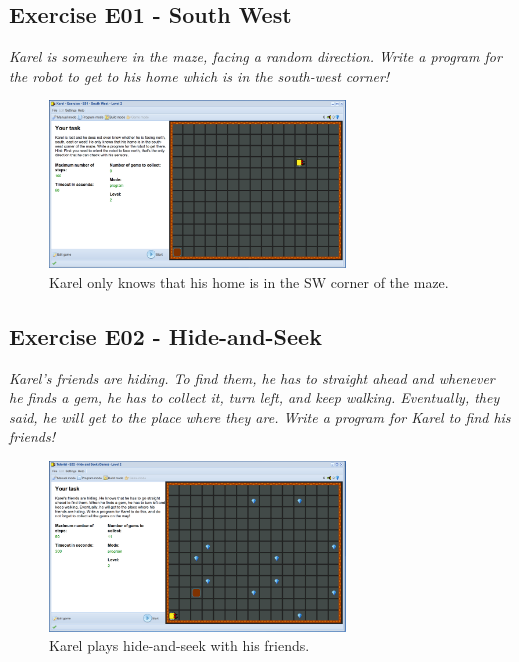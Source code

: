 \documentclass[article,A4,12pt]{llncs}
\begin{document}
{{{{\subsection{Exercise E01 - South West}

{\em Karel is somewhere in the maze, facing a random direction. Write a program for the robot to get 
to his home which is in the south-west corner!}\\[-7mm]


\begin{figure}[!ht]
\begin{center}
\includegraphics[width=0.7\textwidth]{img/e01.png}
\end{center}
\vspace{-4mm}
\caption{Karel only knows that his home is in the SW corner of the maze.}
\label{fig:e01}
\end{figure}
\noindent


\subsection{Exercise E02 - Hide-and-Seek}

{\em Karel's friends are hiding. To find them, he has to straight ahead 
and whenever he finds a gem, he has to collect it, 
turn left, and keep walking. Eventually, they said, he will get to the place 
where they are. Write a program for Karel to find his friends!}\\[-7mm]


\begin{figure}[!ht]
\begin{center}
\includegraphics[width=0.7\textwidth]{img/e02.png}
\end{center}
\vspace{-4mm}
\caption{Karel plays hide-and-seek with his friends.}
\label{fig:e02}
\vspace{-10mm}
\end{figure}
\noindent
\newpage

}}}}
\end{document}
